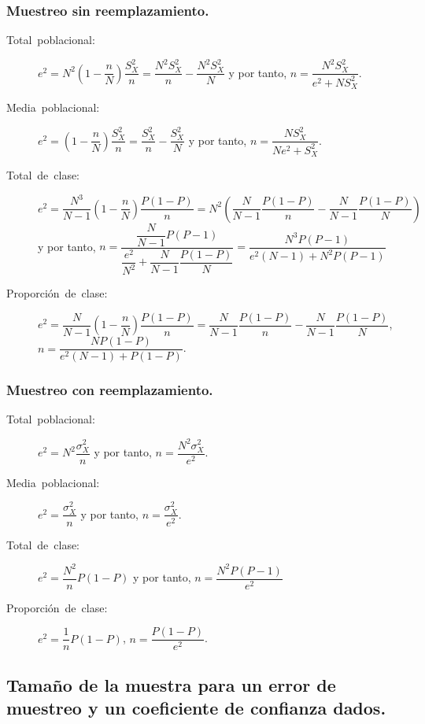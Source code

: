 \subsubsection{Muestreo sin reemplazamiento.}
\begin{description}
\item [{Total~poblacional:}] $e^{2}=N^{2}\left(1-\dfrac{n}{N}\right)\dfrac{S_{X}^{2}}{n}=\dfrac{N^{2}S_{X}^{2}}{n}-\dfrac{N^{2}S_{X}^{2}}{N}$
y por tanto, $n=\dfrac{N^{2}S_{X}^{2}}{e^{2}+NS_{X}^{2}}$.
\item [{Media~poblacional:}] $e^{2}=\left(1-\dfrac{n}{N}\right)\dfrac{S_{X}^{2}}{n}=\dfrac{S_{X}^{2}}{n}-\dfrac{S_{X}^{2}}{N}$
y por tanto, $n=\dfrac{NS_{X}^{2}}{Ne^{2}+S_{X}^{2}}$.
\item [{Total~de~clase:}] $e^{2}=\dfrac{N^{3}}{N-1}\left(1-\dfrac{n}{N}\right)\dfrac{P\left(1-P\right)}{n}=N^{2}\left(\dfrac{N}{N-1}\dfrac{P\left(1-P\right)}{n}-\dfrac{N}{N-1}\dfrac{P\left(1-P\right)}{N}\right)$
y por tanto, $n=\dfrac{\dfrac{N}{N-1}P\left(P-1\right)}{\dfrac{e^{2}}{N^{2}}+\dfrac{N}{N-1}\dfrac{P\left(1-P\right)}{N}}=\dfrac{N^{3}P\left(P-1\right)}{e^{2}\left(N-1\right)+N^{2}P\left(P-1\right)}$
\item [{Proporci\'on~de~clase:}] $e^{2}=\dfrac{N}{N-1}\left(1-\dfrac{n}{N}\right)\dfrac{P\left(1-P\right)}{n}=\dfrac{N}{N-1}\dfrac{P\left(1-P\right)}{n}-\dfrac{N}{N-1}\dfrac{P\left(1-P\right)}{N}$,
$n=\dfrac{NP(1-P)}{e^{2}\left(N-1\right)+P(1-P)}$.
\end{description}

\subsubsection{Muestreo con reemplazamiento.}
\begin{description}
\item [{Total~poblacional:}] $e^{2}=N^{2}\dfrac{\sigma_{X}^{2}}{n}$ y
por tanto, $n=\dfrac{N^{2}\sigma_{X}^{2}}{e^{2}}$.
\item [{Media~poblacional:}] $e^{2}=\dfrac{\sigma_{X}^{2}}{n}$ y por
tanto, $n=\dfrac{\sigma_{X}^{2}}{e^{2}}$.
\item [{Total~de~clase:}] $e^{2}=\dfrac{N^{2}}{n}P(1-P)$ y por tanto,
$n=\dfrac{N^{2}P\left(P-1\right)}{e^{2}}$
\item [{Proporci\'on~de~clase:}] $e^{2}=\dfrac{1}{n}P(1-P)$, $n=\dfrac{P(1-P)}{e^{2}}$.
\end{description}

\subsection{Tama\~no de la muestra para un error de muestreo y un coeficiente de
confianza dados.}

